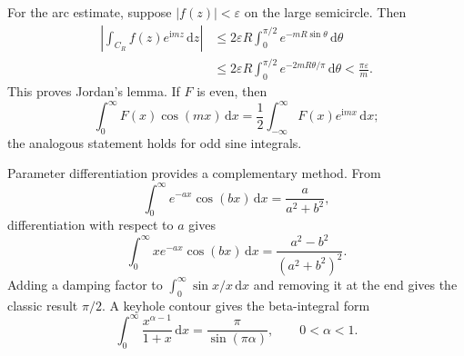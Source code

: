 For the arc estimate, suppose $|f(z)|<\varepsilon$ on the large semicircle. Then
\begin{align}
\left|\int_{C_R}f(z)e^{\mathrm{i}mz}\,\mathrm{d}z\right|
&\leq2\varepsilon R\int_0^{\pi/2}e^{-mR\sin\theta}\,\mathrm{d}\theta\nonumber\\
&\leq2\varepsilon R\int_0^{\pi/2}e^{-2mR\theta/\pi}\,\mathrm{d}\theta
<\frac{\pi\varepsilon}{m}.
\end{align}
This proves Jordan's lemma. If $F$ is even, then
\begin{equation}
\int_0^\infty F(x)\cos(mx)\,\mathrm{d}x
=\frac12\int_{-\infty}^{\infty}F(x)e^{\mathrm{i}mx}\,\mathrm{d}x;
\end{equation}
the analogous statement holds for odd sine integrals.

Parameter differentiation provides a complementary method. From
\begin{equation}
\int_0^\infty e^{-ax}\cos(bx)\,\mathrm{d}x=\frac{a}{a^2+b^2},
\end{equation}
differentiation with respect to $a$ gives
\begin{equation}
\int_0^\infty xe^{-ax}\cos(bx)\,\mathrm{d}x=\frac{a^2-b^2}{(a^2+b^2)^2}.
\end{equation}
Adding a damping factor to $\int_0^\infty\sin x/x\,\mathrm{d}x$ and removing it at the end gives the classic result $\pi/2$. A keyhole contour gives the beta-integral form
\begin{equation}
\int_0^\infty\frac{x^{\alpha-1}}{1+x}\,\mathrm{d}x=\frac{\pi}{\sin(\pi\alpha)},\qquad 0<\alpha<1.
\end{equation}
